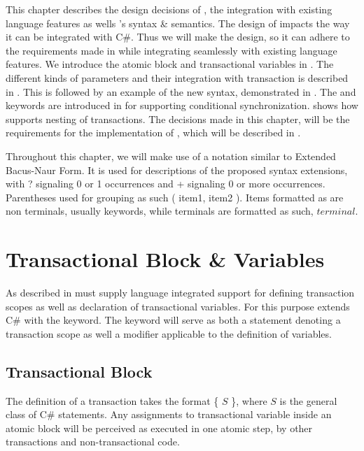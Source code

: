 \makeatletter {}\makeatother
{}
This chapter describes the design decisions of \stmname, the integration with existing language features as wells \stmname's syntax \& semantics. The design of \stmnamesp impacts the way it can be integrated with C\#. Thus we will make the design, so it can adhere to the requirements made in  while integrating seamlessly with existing language features. We introduce the atomic block and transactional variables in . The different kinds of parameters and their integration with transaction is described in . This is followed by an example of the new syntax, demonstrated in . The  and  keywords are introduced in  for supporting conditional synchronization.  shows how \stmnamesp supports nesting of transactions. The decisions made in this chapter, will be the requirements for the implementation of \stmnamesp, which will be described in .

Throughout this chapter, we will make use of a notation similar to Extended Bacus-Naur Form. It is used for descriptions of the proposed syntax extensions, with ? signaling 0 or 1 occurrences and + signaling 0 or more occurrences. Parentheses used for grouping as such ( item1, item2 ). Items formatted as  are non terminals, usually keywords, while terminals are formatted as such, $terminal$. 
\label{chap:stm_design}

\section{Transactional Block \& Variables}\label{sec:stm_design}
As described in  \stmnamesp must supply language integrated support for defining transaction scopes as well as declaration of transactional variables. For this purpose \stmnamesp extends C\# with the  keyword. The  keyword will serve as both a statement denoting a transaction scope as well a modifier applicable to the definition of variables. 

\subsection{Transactional Block}
The definition of a transaction takes the format  \{ $S$ \}, where $S$ is the general class of C\# statements. Any assignments to transactional variable inside an atomic block will be perceived as executed in one atomic step, by other transactions and non-transactional code.

